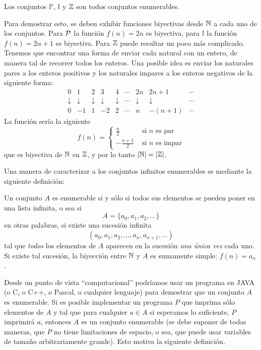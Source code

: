 \begin{teorema}
Los conjuntos $\mathbb P$, $\mathbb I$ y $\Z$ son todos conjuntos enumerables.

\begin{demostracion}
Para demostrar esto, se deben exhibir funciones biyectivas desde $\N$ a cada uno de los conjuntos.
Para $\P$ la función $f(n)=2n$ es biyectiva, para $\mathbb I$ la función $f(n)=2n+1$ es biyectiva.
Para $\Z$ puede resultar un poco más complicado.
Tenemos que encontrar una forma de enviar cada natural con un entero, de manera tal de recorrer todos los enteros.
Una posible idea es enviar los naturales pares a los enteros positivos y los naturales impares a los enteros negativos de la siguiente forma:
\[
\begin{array}{ccccccccccccccc}
0 & 1 & 2 & 3 & 4 & \cdots & 2n & 2n+1 & \cdots \\
\downarrow&\downarrow&\downarrow&\downarrow&\downarrow&\cdots&\downarrow&\downarrow&\cdots\\
0 & -1 & 1 & -2 & 2 & \cdots & n & -(n+1) & \cdots
\end{array}
\]
La función sería la siguiente
\[
f(n)=\left\{\begin{array}{cr}
		\frac{n}{2}&\text{ si }n\text{ es par} \\
		-\frac{n+1}{2}&\text{ si }n\text{ es impar}
		\end{array}\right.
\]
que es biyectiva de $\N$ en $\Z$, y por lo tanto $|\N|=|\Z|$.
\end{demostracion}
\end{teorema}

Una manera de caracterizar a los conjuntos infinitos enumerables es mediante la siguiente definición:

\begin{definicion}[(Alternativa)]
Un conjunto $A$ es enumerable si y sólo si todos sus elementos se pueden poner en una lista infinita, o sea si 
\[
A=\{a_0,a_1,a_2,\ldots\}
\]
en otras palabras, si existe una sucesión infinita
\[
(a_0,a_1,a_2,\ldots,a_n,a_{n+1},\ldots)
\]
tal que \emph{todos} los elementos de $A$ aparecen en la sucesión \emph{una única vez} cada uno.
Si existe tal sucesión, la biyección entre $\N$ y $A$ es sumamente simple: $f(n)=a_n$.
\end{definicion}

Desde un punto de vista ``computacional'' podr\'{i}amos usar un programa en JAVA (o C, o C++, o Pascal, o cualquier lenguaje) para demostrar que un conjunto $A$ es enumerable. Si es posible implementar un programa $P$
que imprima sólo elementos de $A$ y tal que para cualquier $a\in A$ si esperamos lo suficiente, $P$ imprimirá $a$,
entonces $A$ es un conjunto enumerable (se debe suponer de todas maneras, que $P$ no tiene limitaciones de espacio, o sea, que puede usar variables de tamaño arbitrariamente grande).
Esto motiva la siguiente definición.

